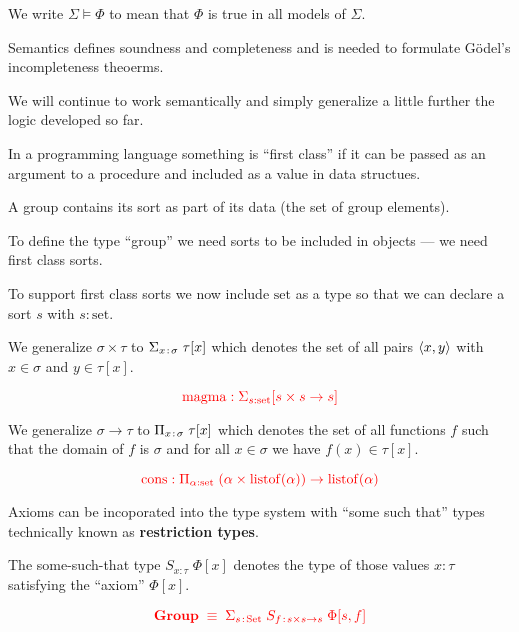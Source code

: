{\vfill
We write $\Sigma \models \Phi$ to mean that $\Phi$ is true in all models of $\Sigma$.

\vfill Semantics defines soundness and completeness and is needed to formulate G\"{o}del's incompleteness theoerms.

\vfill
We will continue to work semantically and simply generalize a little further the logic developed so far.


In a programming language something is ``first class'' if it can be passed as an argument to a procedure and included as a value in data structues.

\vfill
A group contains its sort as part of its data (the set of group elements).

\vfill
To define the type ``group'' we need sorts to be included in objects --- we need first class sorts.


\vfill
To support first class sorts we now include {\color{red} $\mathrm{set}$} as a type so that we can declare a sort $s$ with
{\color{red}$s:\mathrm{set}$}.

\vfill
We generalize {\color{red} $\sigma \times \tau$} to {\color{red} $\Sigma_{x\;\!:\!\;\sigma}\;\tau[x]$} which denotes the set of all pairs ${\mbox{$\langle x,y\rangle$}}$ with $x \in \sigma$ and $y \in \tau[x]$.

$${\color{red} \mathrm{magma}: \Sigma_{s:\mathrm{set}} [s\times s \rightarrow s]}$$


We generalize {\color{red} $\sigma \rightarrow \tau$} to {\color{red} $\Pi_{x\;\!:\!\;\sigma}\;\tau[x]$} which denotes the set of all functions $f$ such that the domain of
$f$ is $\sigma$ and for all $x \in \sigma$ we have $f(x) \in \tau[x]$.

\vfill
$${\color{red} \mathrm{\mathrm{cons}}: \Pi_{\alpha:\mathrm{set}}\; (\alpha \times \mathrm{listof}(\alpha)) \rightarrow \mathrm{listof}(\alpha)}$$


Axioms can be incoporated into the type system with ``some such that'' types technically known as {\bf restriction types}.

\vfill
The some-such-that type {\color{red}$S_{x:\tau}\;\Phi[x]$} denotes the type of those values $x:\tau$ satisfying the ``axiom'' $\Phi[x]$.

\vfill
$${\color{red} \mathbf{Group} \; \equiv \; \Sigma_{s\;\!:\!\;\mathrm{Set}}\;S_{f\;\!:\!\; s\times s \rightarrow s}\;\Phi[s,f]}$$
\vfill

}
